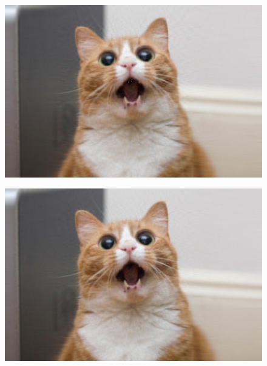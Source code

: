 \begin{sol}
\begin{figure}[h]
    \begin{minipage}[t]{.24\textwidth}
        \centering
        \includegraphics[width=1.1\textwidth]{41.jpg}
        \label{fig:p41}
    \end{minipage}
    \hfill
    \begin{minipage}[t]{.24\textwidth}
        \centering
        \includegraphics[width=1.1\textwidth]{51.jpg}
        \label{fig:p51}
    \end{minipage}  
    

\end{figure}
\end{sol}
